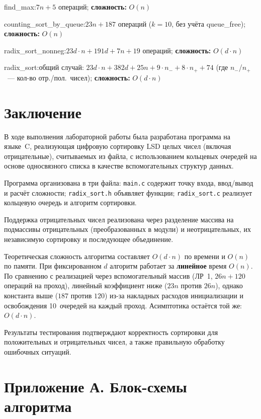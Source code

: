 \documentclass[a4paper,14pt]{extarticle}
\newcommand{\opcount}[2]{%
  \par\vspace{2pt}%
  \noindent
  \colorbox{gray!15}{%
    \parbox{\dimexpr\linewidth-2\fboxsep\relax}{%
      \small\bfseries\ttfamily\raggedright #1:\enskip #2%
    }%
  }%
  \par\vspace{6pt}%
}
\begin{document}

\opcount{find\_max}{$7n + 5$ операций; \textbf{сложность:} $O(n)$}
\opcount{counting\_sort\_by\_queue}{$23n + 187$ операций ($k{=}10$, без учёта queue\_free); \textbf{сложность:} $O(n)$}
\opcount{radix\_sort\_nonneg}{$23d\cdot n + 191d + 7n + 19$ операций; \textbf{сложность:} $O(d \cdot n)$}
\opcount{radix\_sort}{общий случай: $23d\cdot n + 382d + 25n + 9\cdot n_- + 8\cdot n_+ + 74$ (где $n_-$/$n_+$~--- кол-во отр./пол.\ чисел); \textbf{сложность:} $O(d \cdot n)$}

\newpage
\section*{Заключение}

В ходе выполнения лабораторной работы была разработана программа на языке~C, реализующая цифровую сортировку LSD целых чисел (включая отрицательные), считываемых из файла, с использованием кольцевых очередей на основе односвязного списка в качестве вспомогательных структур данных.

Программа организована в три файла: \texttt{main.c} содержит точку входа, ввод/вывод и расчёт сложности; \texttt{radix\_sort.h} объявляет функции; \texttt{radix\_sort.c} реализует кольцевую очередь и алгоритм сортировки.

Поддержка отрицательных чисел реализована через разделение массива на подмассивы отрицательных (преобразованных в модули) и неотрицательных, их независимую сортировку и последующее объединение.

Теоретическая сложность алгоритма составляет $O(d \cdot n)$ по времени и $O(n)$ по памяти. При фиксированном $d$ алгоритм работает за \textbf{линейное} время $O(n)$. По сравнению с реализацией через вспомогательный массив (ЛР~1, $26n + 120$ операций на проход), линейный коэффициент ниже ($23n$ против $26n$), однако константа выше ($187$ против $120$) из-за накладных расходов инициализации и освобождения 10~очередей на каждый проход. Асимптотика остаётся той же: $O(d \cdot n)$.

Результаты тестирования подтверждают корректность сортировки для положительных и отрицательных чисел, а также правильную обработку ошибочных ситуаций.

\newpage
{}
\label{sec:appendix}
\section*{Приложение А. Блок-схемы алгоритма}
\end{document}
